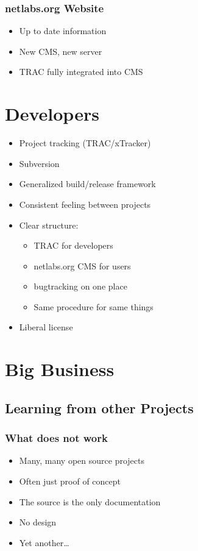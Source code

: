 \documentclass{beamer}
\begin{document}
\begin{frame}
\frametitle{netlabs.org Website}
\begin{itemize}[<+->]
  \item Up to date information
  \item New CMS, new server
  \item TRAC fully integrated into CMS
\end{itemize}
\end{frame}

\section{Developers}
\begin{frame}
\begin{itemize}[<+->]
  \item Project tracking (TRAC/xTracker)
  \item Subversion
  \item Generalized build/release framework
  \item Consistent feeling between projects
  \item Clear structure:
  \begin{itemize}[<+->]
    \item TRAC for developers
    \item netlabs.org CMS for users
    \item bugtracking on one place
    \item Same procedure for same things
  \end{itemize}
  \item Liberal license
\end{itemize}
\end{frame}

\section{Big Business}
\subsection{Learning from other Projects}

\begin{frame}
\frametitle{What does \textbf{not} work}
\begin{itemize}[<+->]
  \item Many, many open source projects
  \item Often just proof of concept
  \item The source is the only documentation\texttrademark
  \item No design
  \item Yet another\ldots
\end{itemize}
\end{frame}
\end{document}
